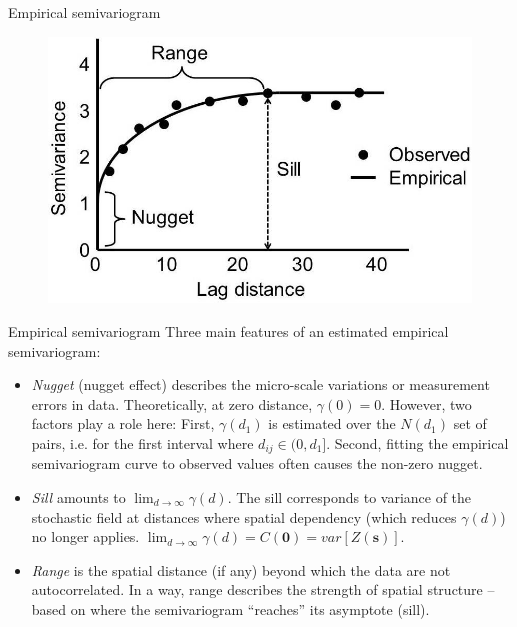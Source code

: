 \documentclass{beamer}
\begin{document}
\begin{frame}{Empirical semivariogram}
\vspace{-0.5cm}
\begin{figure}
	\includegraphics[width=.8\textwidth]{IMG/sp_svgm.jpg}
\end{figure}
\end{frame}
\begin{frame}{Empirical semivariogram}
Three main features of an estimated empirical semivariogram: 
\begin{itemize}
\item \textit{Nugget} (nugget effect) describes the micro-scale variations or measurement errors in data. Theoretically, at zero distance, $\gamma(0)=0$. However, two factors play a role here: First, $\gamma(d_1)$ is estimated over the $N(d_1)$ set of pairs, i.e. for the first interval where $ d_{ij} \in (0, d_1 ]$. Second, fitting the empirical semivariogram curve to observed values often causes the non-zero nugget.
\smallskip
\item \textit{Sill} amounts to $\lim_{d \to \infty} \gamma(d)$. The sill corresponds to variance of the stochastic field at distances where spatial dependency (which reduces $\gamma(d)$) no longer applies. $\lim_{d \to \infty} \gamma(d) = C(\bm{0}) = \textit{var}[Z(\bm{s})]$.
\smallskip
\item \textit{Range} is the spatial distance (if any) beyond which the data are not autocorrelated. In a way, range describes the strength of spatial structure -- based on where the semivariogram ``reaches'' its asymptote (sill).
\end{itemize}
\end{frame}
\end{document}
